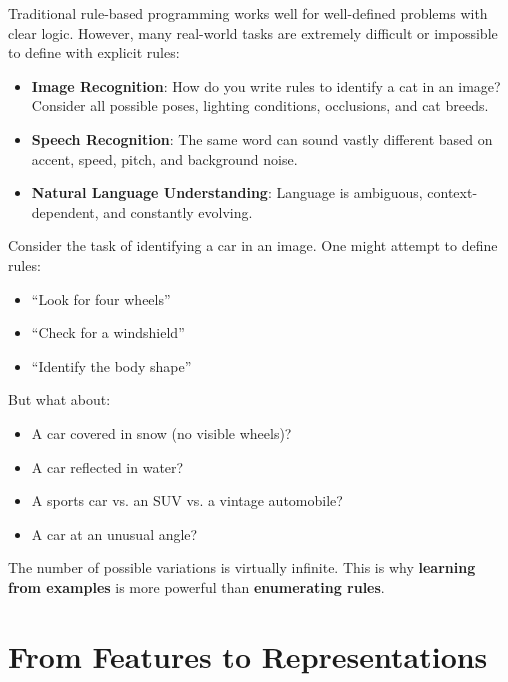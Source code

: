 Traditional rule-based programming works well for well-defined problems with clear logic. However, many real-world tasks are extremely difficult or impossible to define with explicit rules:

\begin{itemize}
    \item \textbf{Image Recognition}: How do you write rules to identify a cat in an image? Consider all possible poses, lighting conditions, occlusions, and cat breeds.
    \item \textbf{Speech Recognition}: The same word can sound vastly different based on accent, speed, pitch, and background noise.
    \item \textbf{Natural Language Understanding}: Language is ambiguous, context-dependent, and constantly evolving.
\end{itemize}

\begin{bluebox}
Consider the task of identifying a car in an image. One might attempt to define rules:
\begin{itemize}
    \item ``Look for four wheels''
    \item ``Check for a windshield''
    \item ``Identify the body shape''
\end{itemize}

But what about:
\begin{itemize}
    \item A car covered in snow (no visible wheels)?
    \item A car reflected in water?
    \item A sports car vs. an SUV vs. a vintage automobile?
    \item A car at an unusual angle?
\end{itemize}

The number of possible variations is virtually infinite. This is why \textbf{learning from examples} is more powerful than \textbf{enumerating rules}.
\end{bluebox}


\section{From Features to Representations}


